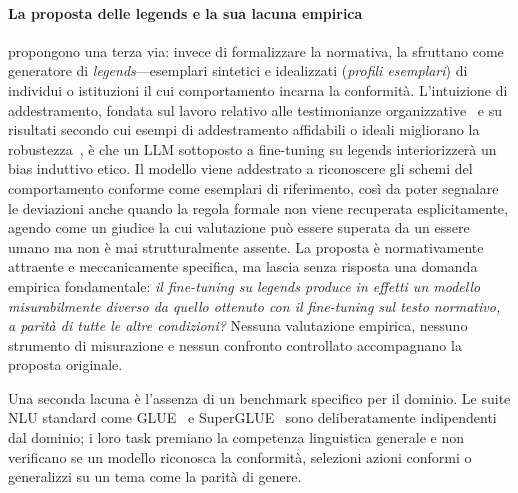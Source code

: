 \documentclass[pdflatex, sn-apa]{sn-jnl}%
\theoremstyle{thmstyleone}%
\theoremstyle{thmstyletwo}%
\theoremstyle{thmstylethree}%
\begin{document}
\paragraph{La proposta delle legends e la sua lacuna empirica}
\citet{sargsyan2025legends} propongono una terza via: invece di formalizzare la
normativa, la sfruttano come generatore di \emph{legends}---esemplari sintetici e
idealizzati (\emph{profili esemplari}) di individui o istituzioni il cui
comportamento incarna la conformità. L'intuizione di addestramento, fondata sul
lavoro relativo alle testimonianze
organizzative~\citep{kanyamukenge2024testimonials} e su risultati secondo cui
esempi di addestramento affidabili o ideali migliorano la
robustezza~\citep{northcutt2017cleaning}, è che un LLM sottoposto a fine-tuning
su legends interiorizzerà un bias induttivo etico. Il modello viene addestrato a
riconoscere gli schemi del comportamento conforme come esemplari di riferimento,
così da poter segnalare le deviazioni anche quando la regola formale non viene
recuperata esplicitamente, agendo come un giudice la cui valutazione può essere
superata da un essere umano ma non è mai strutturalmente assente. La proposta è
normativamente attraente e meccanicamente specifica, ma lascia senza risposta
una domanda empirica fondamentale: \emph{il fine-tuning su legends produce in
effetti un modello misurabilmente diverso da quello ottenuto con il fine-tuning
sul testo normativo, a parità di tutte le altre condizioni?} Nessuna valutazione
empirica, nessuno strumento di misurazione e nessun confronto controllato
accompagnano la proposta originale.

Una seconda lacuna è l'assenza di un benchmark specifico per il dominio. Le suite
NLU standard come GLUE~\citep{wang2018glue} e SuperGLUE~\citep{wang2019superglue}
sono deliberatamente indipendenti dal dominio; i loro task premiano la competenza
linguistica generale e non verificano se un modello riconosca la conformità,
selezioni azioni conformi o generalizzi su un tema come la parità di genere.

\end{document}
